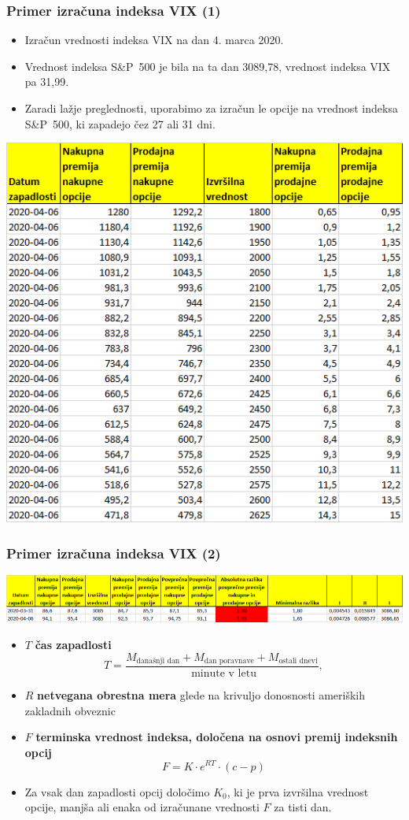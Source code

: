 \documentclass[10pt]{beamer}
\begin{document}
\begin{frame}
\frametitle{Primer izračuna indeksa VIX (1)}
\begin{itemize}
\item Izračun vrednosti indeksa VIX na dan 4. marca 2020.
\item Vrednost indeksa S\&P~500 je bila na ta dan 3089,78, vrednost indeksa VIX pa 31,99.	
\item Zaradi lažje preglednosti, uporabimo za izračun le opcije na vrednost indeksa S\&P~500, ki zapadejo čez 27 ali 31 dni.
\end{itemize}
\includegraphics[width=1\textwidth]{./Grafi/Opcije_clean.png}


\end{frame}


\begin{frame}
\frametitle{Primer izračuna indeksa VIX (2)}
\includegraphics[width=1\textwidth]{./Grafi/Opcije_min_diff.png}
\begin{itemize}
\item $T$ \textbf{čas zapadlosti}
$$
T = \frac{ M_{\text{današnji dan}} + M_{\text{dan poravnave}} + M_{\text{ostali dnevi}}}{\text{ minute v letu}},
$$
\item $R$ \textbf{netvegana obrestna mera} glede na krivuljo donosnosti ameriških zakladnih obveznic
\item $F$ \textbf{terminska vrednost indeksa, določena na osnovi premij indeksnih opcij}
$$
F=K \cdot e^{RT} \cdot (c-p)
$$
\item Za vsak dan zapadlosti opcij določimo $K_0$, ki je prva izvršilna vrednost opcije, manjša ali enaka od izračunane vrednosti $F$ za tisti dan.

\end{itemize}


\end{frame}
\end{document}
